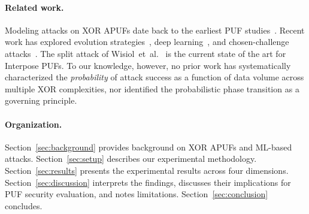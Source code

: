 \paragraph{Related work.}
Modeling attacks on XOR APUFs date back to the earliest PUF
studies~\cite{ruhrmair2010modeling}.  Recent work has explored evolution
strategies~\cite{becker2015cia, calypso2024}, deep
learning~\cite{fei2024mope, wisiol2020splitting}, and chosen-challenge
attacks~\cite{sayadi2025}.  The split attack of Wisiol~et~al.~\cite{wisiol2020splitting}
is the current state of the art for Interpose PUFs.  To our knowledge,
however, no prior work has systematically characterized the \emph{probability}
of attack success as a function of data volume across multiple XOR
complexities, nor identified the probabilistic phase transition as a
governing principle.

\paragraph{Organization.}
Section~\ref{sec:background} provides background on XOR APUFs and ML-based
attacks.  Section~\ref{sec:setup} describes our experimental methodology.
Section~\ref{sec:results} presents the experimental results across four
dimensions.  Section~\ref{sec:discussion} interprets the findings, discusses
their implications for PUF security evaluation, and notes limitations.
Section~\ref{sec:conclusion} concludes.
